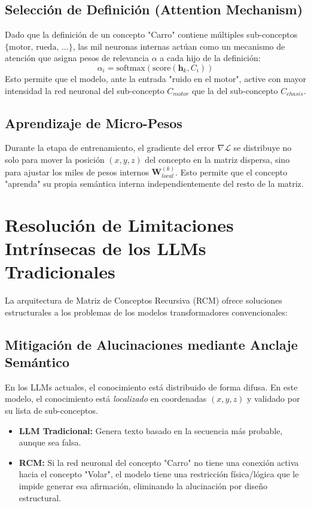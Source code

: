 \documentclass[12pt]{article}
\begin{document}
\subsection{Selección de Definición (Attention Mechanism)}
Dado que la definición de un concepto "Carro" contiene múltiples sub-conceptos $\{\text{motor, rueda, ...}\}$, las mil neuronas internas actúan como un mecanismo de atención que asigna pesos de relevancia $\alpha$ a cada hijo de la definición:
$$ \alpha_i = \text{softmax}( \text{score}(\mathbf{h}_k, C_i) ) $$
Esto permite que el modelo, ante la entrada "ruido en el motor", active con mayor intensidad la red neuronal del sub-concepto $C_{motor}$ que la del sub-concepto $C_{chasis}$.

\subsection{Aprendizaje de Micro-Pesos}
Durante la etapa de entrenamiento, el gradiente del error $\nabla \mathcal{L}$ se distribuye no solo para mover la posición $(x, y, z)$ del concepto en la matriz dispersa, sino para ajustar los miles de pesos internos $\mathbf{W}_{local}^{(k)}$. Esto permite que el concepto "aprenda" su propia semántica interna independientemente del resto de la matriz.

\section{Resolución de Limitaciones Intrínsecas de los LLMs Tradicionales}

La arquitectura de Matriz de Conceptos Recursiva (RCM) ofrece soluciones estructurales a los problemas de los modelos transformadores convencionales:

\subsection{Mitigación de Alucinaciones mediante Anclaje Semántico}
En los LLMs actuales, el conocimiento está distribuido de forma difusa. En este modelo, el conocimiento está \textit{localizado} en coordenadas $(x, y, z)$ y validado por su lista de sub-conceptos.
\begin{itemize}
    \item \textbf{LLM Tradicional:} Genera texto basado en la secuencia más probable, aunque sea falsa.
    \item \textbf{RCM:} Si la red neuronal del concepto "Carro" no tiene una conexión activa hacia el concepto "Volar", el modelo tiene una restricción física/lógica que le impide generar esa afirmación, eliminando la alucinación por diseño estructural.
\end{itemize}
\end{document}
